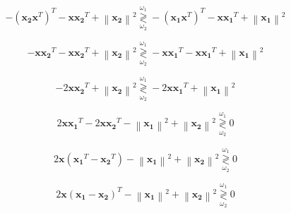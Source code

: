 \documentclass[fleqn]{article}
\newcommand{\norm}[1]{\left \lVert #1 \right \rVert}
\begin{document}
\begin{enumerate}
		\begin{equation*}
			- (\mathbf{x_2}\mathbf{x}^T)^T - \mathbf{x}\mathbf{x_2}^T + \norm{\mathbf{x_2}}^2 \overset{\omega_1}{\underset{\omega_2}{\gtrless}} - (\mathbf{x_1}\mathbf{x}^T)^T - \mathbf{x}\mathbf{x_1}^T + \norm{\mathbf{x_1}}^2
		\end{equation*}
		
		\begin{equation*}
			- \mathbf{x}\mathbf{x_2}^T - \mathbf{x}\mathbf{x_2}^T + \norm{\mathbf{x_2}}^2 \overset{\omega_1}{\underset{\omega_2}{\gtrless}} - \mathbf{x}\mathbf{x_1}^T - \mathbf{x}\mathbf{x_1}^T + \norm{\mathbf{x_1}}^2
		\end{equation*}
		
		\begin{equation*}
			- 2\mathbf{x}\mathbf{x_2}^T + \norm{\mathbf{x_2}}^2 \overset{\omega_1}{\underset{\omega_2}{\gtrless}} - 2\mathbf{x}\mathbf{x_1}^T + \norm{\mathbf{x_1}}^2
		\end{equation*}
		
		\begin{equation*}
			2\mathbf{x}\mathbf{x_1}^T - 2\mathbf{x}\mathbf{x_2}^T - \norm{\mathbf{x_1}}^2 + \norm{\mathbf{x_2}}^2 \overset{\omega_1}{\underset{\omega_2}{\gtrless}} 0
		\end{equation*}
		
		\begin{equation*}
			2\mathbf{x}(\mathbf{x_1}^T - \mathbf{x_2}^T) - \norm{\mathbf{x_1}}^2 + \norm{\mathbf{x_2}}^2 \overset{\omega_1}{\underset{\omega_2}{\gtrless}} 0
		\end{equation*}
		
		\begin{equation*}
			2\mathbf{x}(\mathbf{x_1} - \mathbf{x_2})^T - \norm{\mathbf{x_1}}^2 + \norm{\mathbf{x_2}}^2 \overset{\omega_1}{\underset{\omega_2}{\gtrless}} 0
		\end{equation*}
		
	\end{enumerate}
\end{document}

